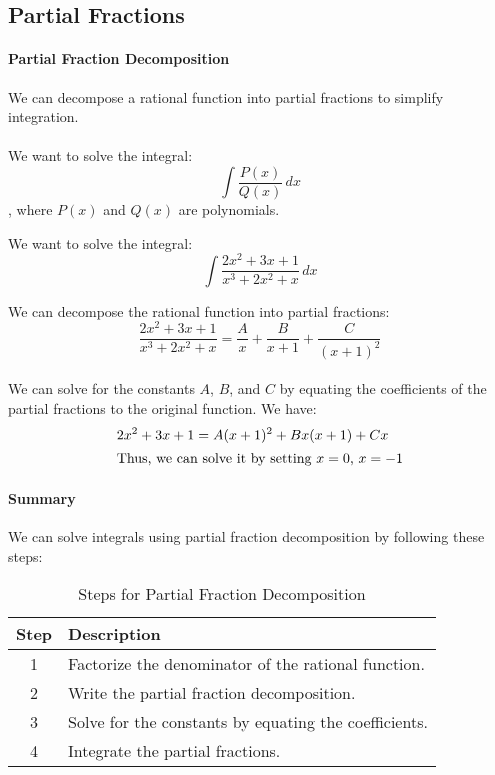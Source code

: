 \documentclass[11pt]{report}
\begin{document}
\subsection{Partial Fractions}
\paragraph{Partial Fraction Decomposition} We can decompose a rational function into partial fractions to simplify integration.
\paragraph{} We want to solve the integral:
\begin{equation}
    \int \frac{P(x)}{Q(x)} \, dx
\end{equation}
, where $P(x)$ and $Q(x)$ are polynomials.
\begin{example}
We want to solve the integral:
$$ \int \frac{2x^2 + 3x + 1}{x^3 + 2x^2 + x} \, dx $$
\end{example}
We can decompose the rational function into partial fractions:
$$ \frac{2x^2 + 3x + 1}{x^3 + 2x^2 + x} = \frac{A}{x} + \frac{B}{x+1} + \frac{C}{(x+1)^2} $$
\paragraph{} We can solve for the constants $A$, $B$, and $C$ by equating the coefficients of the partial fractions to the original function. We have:
\begin{align*}
    2x^2 + 3x + 1 &= A(x+1)^2 + Bx(x+1) + Cx \\
    \intertext{Thus, we can solve it by setting $x = 0$, $x = -1$}
\end{align*}
\paragraph{Summary} We can solve integrals using partial fraction decomposition by following these steps:
\begin{table}[h!]
    \centering
    \begin{tabular}{|c|l|}
    \hline
    \textbf{Step} & \textbf{Description} \\ \hline
    1 & Factorize the denominator of the rational function. \\
    2 & Write the partial fraction decomposition. \\
    3 & Solve for the constants by equating the coefficients. \\
    4 & Integrate the partial fractions. \\ \hline
    \end{tabular}
    \caption{Steps for Partial Fraction Decomposition}
\end{table}
\end{document}
